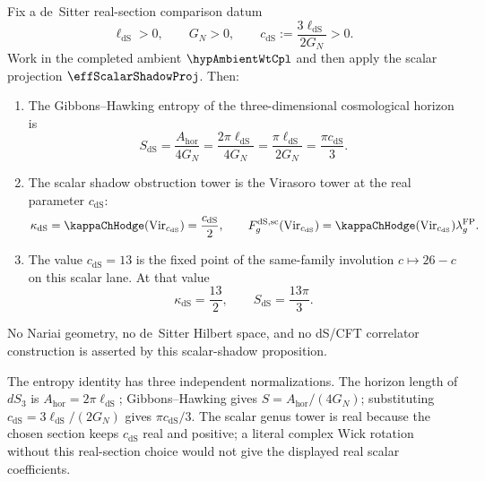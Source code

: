 \begin{proposition}
\label{prop:gravity-desitter}
Fix a de~Sitter real-section comparison datum
\[
\ell_{\mathrm{dS}}>0,\qquad G_N>0,\qquad
c_{\mathrm{dS}}:=\frac{3\ell_{\mathrm{dS}}}{2G_N}>0.
\]
Work in the completed ambient $\hypAmbientWtCpl$ and then apply the
scalar projection $\effScalarShadowProj$. Then:
\begin{enumerate}[label=\textup{(\roman*)}]
\item The Gibbons--Hawking entropy of the three-dimensional
 cosmological horizon is
 \[
 S_{\mathrm{dS}}
 =\frac{A_{\mathrm{hor}}}{4G_N}
 =\frac{2\pi\ell_{\mathrm{dS}}}{4G_N}
 =\frac{\pi\ell_{\mathrm{dS}}}{2G_N}
 =\frac{\pi c_{\mathrm{dS}}}{3}.
 \]
\item The scalar shadow obstruction tower is the Virasoro tower at the
 real parameter \(c_{\mathrm{dS}}\):
 \[
 \kappa_{\mathrm{dS}}
 = \kappaChHodge(\mathrm{Vir}_{c_{\mathrm{dS}}})
 = \frac{c_{\mathrm{dS}}}{2},
 \qquad
 F_g^{\mathrm{dS},\mathrm{sc}}(\mathrm{Vir}_{c_{\mathrm{dS}}})
 = \kappaChHodge(\mathrm{Vir}_{c_{\mathrm{dS}}})
 \lambda_g^{\mathrm{FP}}.
 \]
\item The value \(c_{\mathrm{dS}}=13\) is the fixed point of the
 same-family involution \(c\mapsto 26-c\) on this scalar lane. At that
 value
 \[
 \kappa_{\mathrm{dS}}=\frac{13}{2},\qquad
 S_{\mathrm{dS}}=\frac{13\pi}{3}.
 \]
\end{enumerate}
No Nariai geometry, no de~Sitter Hilbert space, and no dS/CFT
correlator construction is asserted by this scalar-shadow proposition.
\end{proposition}

\begin{remark}
The entropy identity has three independent normalizations. The
horizon length of \(dS_3\) is \(A_{\mathrm{hor}}=2\pi\ell_{\mathrm{dS}}\);
Gibbons--Hawking gives \(S=A_{\mathrm{hor}}/(4G_N)\); substituting
\(c_{\mathrm{dS}}=3\ell_{\mathrm{dS}}/(2G_N)\) gives
\(\pi c_{\mathrm{dS}}/3\). The scalar genus tower is real because the
chosen section keeps \(c_{\mathrm{dS}}\) real and positive; a literal
complex Wick rotation without this real-section choice would not give
the displayed real scalar coefficients.
\end{remark}

